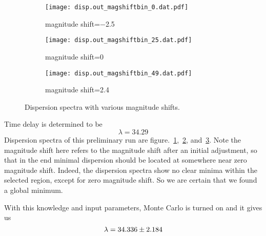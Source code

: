 \begin{figure}[ht]
	\centering
	\begin{subfigure}[t]{\textwidth}
	\begin{center}
		\texttt{[image: disp.out\_magshiftbin\_0.dat.pdf]}
	\end{center}%
	\caption{magnitude shift=\num{-2.5}}
	\label{fig:disp1}
	\end{subfigure}
	\begin{subfigure}[t]{\textwidth}
	\begin{center}
		\texttt{[image: disp.out\_magshiftbin\_25.dat.pdf]}
	\end{center}%
	\caption{magnitude shift=\num{0}}
	\label{fig:disp2}
	\end{subfigure}
	\begin{subfigure}[t]{\textwidth}
	\begin{center}
		\texttt{[image: disp.out\_magshiftbin\_49.dat.pdf]}
	\end{center}%
	\caption{magnitude shift=\num{2.4}}
	\label{fig:disp3}
	\end{subfigure}%
	\caption{Dispersion spectra with various magnitude shifts.}%
	\label{fig:disp}
\end{figure}
Time delay is determined to be
\begin{equation}
	\lambda = \num{34.29}	
\end{equation}
Dispersion spectra of this preliminary run are figure.~\ref{fig:disp1},~\ref{fig:disp2}, and~\ref{fig:disp3}. Note the magnitude shift here refers to the magnitude shift after an initial adjustment, so that in the end minimal dispersion should be located at somewhere near zero magnitude shift. Indeed, the dispersion spectra show no clear minima within the selected region, except for zero magnitude shift. So we are certain that we found a global minimum.

With this knowledge and input parameters, Monte Carlo is turned on and it gives us
\begin{equation}
	\lambda = \num{34.336 +- 2.184}
\end{equation}

